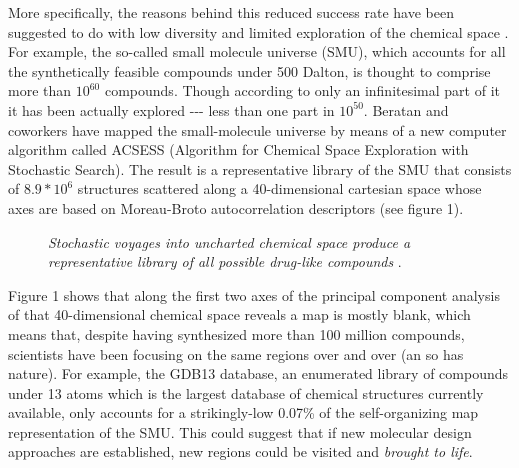 More specifically, the reasons behind this reduced success rate have been suggested to do with low diversity and limited exploration of the chemical space . For example, the so-called small molecule universe (SMU), which accounts for all the synthetically feasible compounds under 500 Dalton, is thought to comprise more than $10^{60}$ compounds. Though according to  only an infinitesimal part of it it has been actually explored -{}-{}- less than one part in $10^{50}$. Beratan and coworkers have mapped the small-molecule universe by means of a new computer algorithm called ACSESS (Algorithm for Chemical Space Exploration with Stochastic Search). The result is a representative library of the SMU that consists of $8.9*10^{6}$ structures scattered along a 40-dimensional cartesian space whose axes are based on Moreau-Broto autocorrelation descriptors  (see figure 1).
\begin{figure}
\noindent{}
\caption[Unexplored chemical space]{\emph{Stochastic voyages into uncharted chemical space produce a representative library of all possible drug-like compounds} .}
\end{figure}

Figure 1 shows that along the first two axes of the principal component analysis of that 40-dimensional chemical space  reveals a map is mostly blank, which means that, despite having synthesized more than 100 million compounds, scientists have been focusing on the same regions over and over (an so has nature). For example, the GDB13 database, an enumerated library of compounds under 13 atoms which is the largest database of chemical structures currently available, only accounts for a strikingly-low 0.07\% of the self-organizing map representation of the SMU. This could suggest that if new molecular design approaches are established, new regions could be visited and \emph{brought to life}.


